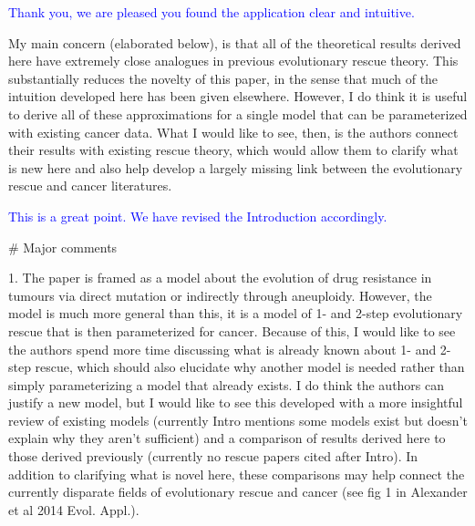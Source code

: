 \documentclass[12pt]{extarticle}
\begin{document}
\textcolor{blue}{
Thank you, we are pleased you found the application clear and intuitive.
} 

My main concern (elaborated below), is that all of the theoretical results derived here have extremely close analogues in previous evolutionary rescue theory. This substantially reduces the novelty of this paper, in the sense that much of the intuition developed here has been given elsewhere. However, I do think it is useful to derive all of these approximations for a single model that can be parameterized with existing cancer data. What I would like to see, then, is the authors connect their results with existing rescue theory, which would allow them to clarify what is new here and also help develop a largely missing link between the evolutionary rescue and cancer literatures.

\textcolor{blue}{This is a great point. We have revised the Introduction accordingly.}

$\#$ Major comments

1. The paper is framed as a model about the evolution of drug resistance in tumours via direct mutation or indirectly through aneuploidy. However, the model is much more general than this, it is a model of 1- and 2-step evolutionary rescue that is then parameterized for cancer. Because of this, I would like to see the authors spend more time discussing what is already known about 1- and 2-step rescue, which should also elucidate why another model is needed rather than simply parameterizing a model that already exists. I do think the authors can justify a new model, but I would like to see this developed with a more insightful review of existing models (currently Intro mentions some models exist but doesn't explain why they aren't sufficient) and a comparison of results derived here to those derived previously (currently no rescue papers cited after Intro). In addition to clarifying what is novel here, these comparisons may help connect the currently disparate fields of evolutionary rescue and cancer (see fig 1 in Alexander et al 2014 Evol. Appl.).
\end{document}
